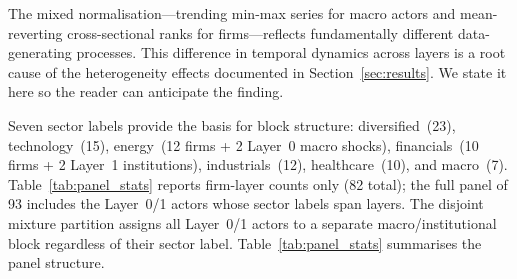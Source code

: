 \documentclass[11pt,a4paper]{article}
\begin{document}
The mixed normalisation---trending min-max series for macro actors and mean-reverting cross-sectional ranks for firms---reflects fundamentally different data-generating processes. This difference in temporal dynamics across layers is a root cause of the heterogeneity effects documented in Section~\ref{sec:results}. We state it here so the reader can anticipate the finding.

Seven sector labels provide the basis for block structure: diversified~(23), technology~(15), energy~(12 firms + 2 Layer~0 macro shocks), financials~(10 firms + 2 Layer~1 institutions), industrials~(12), healthcare~(10), and macro~(7). Table~\ref{tab:panel_stats} reports firm-layer counts only (82 total); the full panel of 93 includes the Layer~0/1 actors whose sector labels span layers. The disjoint mixture partition assigns all Layer~0/1 actors to a separate macro/institutional block regardless of their sector label. Table~\ref{tab:panel_stats} summarises the panel structure.
\end{document}
